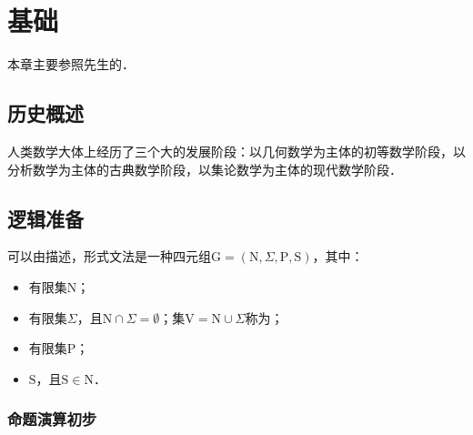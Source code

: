 \chapter{基础}

本章主要参照\citeauthor{WangFt2001}先生的\cite{WangFt2001}．

\section{历史概述}

人类数学大体上经历了三个大的发展阶段：以几何数学为主体的初等数学阶段，以分析数学为主体的古典数学阶段，以集论数学为主体的现代数学阶段．

\section{逻辑准备}


可以由描述，形式文法是一种四元组$\mathrm{G}=(\mathrm{N},\Sigma,\mathrm{P},\mathrm{S})$，其中：
\begin{itemize}
	\item {}有限集$\mathrm{N}$；
	\item {}有限集$\Sigma$，且$\mathrm{N}\cap\Sigma=\emptyset$；集$\mathrm{V}=\mathrm{N}\cup\Sigma$称为；
	\item {}有限集$\mathrm{P}$；
	\item {}$\mathrm{S}$，且$\mathrm{S}\in\mathrm{N}$．
\end{itemize}

\subsection{命题演算初步}

